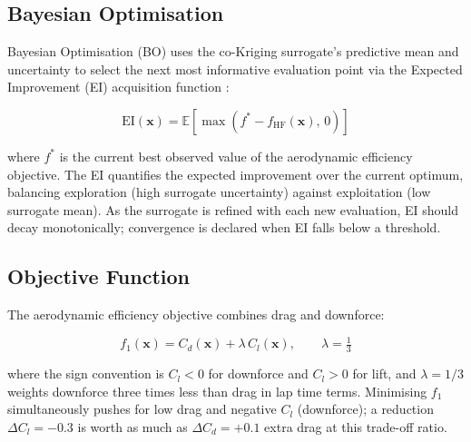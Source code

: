 \subsection{Bayesian Optimisation}

Bayesian Optimisation (BO) uses the co-Kriging surrogate's predictive mean and uncertainty to select the next most informative evaluation point via the Expected Improvement (EI) acquisition function \cite{jones1998}:

\begin{equation}
    \mathrm{EI}(\mathbf{x}) = \mathbb{E}\!\left[\max(f^* - f_\mathrm{HF}(\mathbf{x}),\, 0)\right]
    \label{eq:ei}
\end{equation}

where $f^*$ is the current best observed value of the aerodynamic efficiency objective. The EI quantifies the expected improvement over the current optimum, balancing exploration (high surrogate uncertainty) against exploitation (low surrogate mean). As the surrogate is refined with each new evaluation, EI should decay monotonically; convergence is declared when EI falls below a threshold.

\subsection{Objective Function}

The aerodynamic efficiency objective combines drag and downforce:

\begin{equation}
    f_1(\mathbf{x}) = C_d(\mathbf{x}) + \lambda\,C_l(\mathbf{x}), \qquad \lambda = \tfrac{1}{3}
    \label{eq:objective}
\end{equation}

where the sign convention is $C_l < 0$ for downforce and $C_l > 0$ for lift, and $\lambda = 1/3$ weights downforce three times less than drag in lap time terms. Minimising $f_1$ simultaneously pushes for low drag and negative $C_l$ (downforce); a reduction $\Delta C_l = -0.3$ is worth as much as $\Delta C_d = +0.1$ extra drag at this trade-off ratio.
